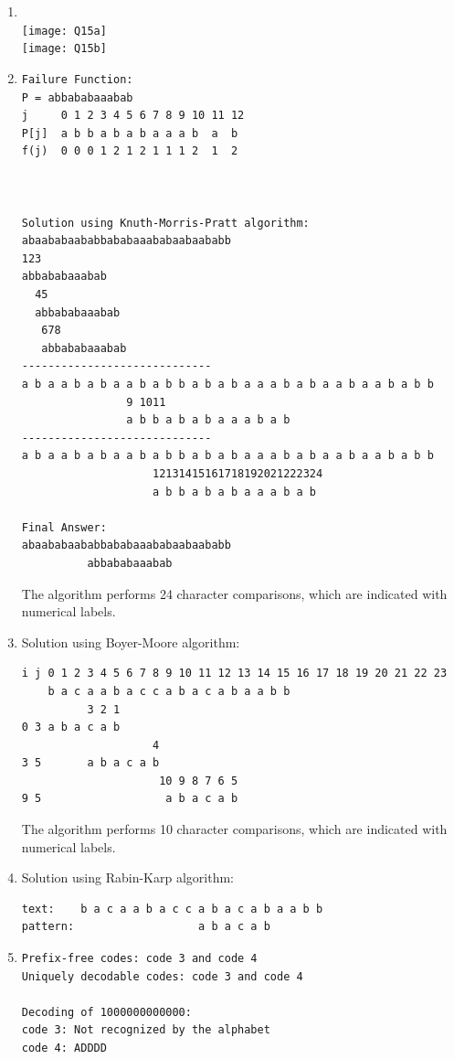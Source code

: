 \documentclass[11pt,fleqn]{article}
\begin{document}
\begin{enumerate}
\newpage

	\item $~$\\
\texttt{[image: Q15a]} \\
\texttt{[image: Q15b]} \\

	\item 
\begin{Verbatim}
Failure Function:
P = abbababaaabab
j     0 1 2 3 4 5 6 7 8 9 10 11 12
P[j]  a b b a b a b a a a b  a  b
f(j)  0 0 0 1 2 1 2 1 1 1 2  1  2



Solution using Knuth-Morris-Pratt algorithm:
abaababaababbababaaababaabaababb
123
abbababaaabab
  45
  abbababaaabab
   678
   abbababaaabab
-----------------------------
a b a a b a b a a b a b b a b a b a a a b a b a a b a a b a b b
                9 1011
                a b b a b a b a a a b a b
-----------------------------
a b a a b a b a a b a b b a b a b a a a b a b a a b a a b a b b
                    12131415161718192021222324
                    a b b a b a b a a a b a b

Final Answer:
abaababaababbababaaababaabaababb
          abbababaaabab
\end{Verbatim}
The algorithm performs 24 character comparisons, which are
indicated with numerical labels.

	\item Solution using Boyer-Moore algorithm:
\begin{Verbatim}
i j 0 1 2 3 4 5 6 7 8 9 10 11 12 13 14 15 16 17 18 19 20 21 22 23
    b a c a a b a c c a b a c a b a a b b
          3 2 1
0 3 a b a c a b
                    4
3 5       a b a c a b
                     10 9 8 7 6 5
9 5                   a b a c a b
\end{Verbatim}
The algorithm performs 10 character comparisons, which are
indicated with numerical labels.
	\item Solution using Rabin-Karp algorithm:
\begin{Verbatim}
text:    b a c a a b a c c a b a c a b a a b b
pattern:                   a b a c a b
\end{Verbatim}

	\item 
\begin{Verbatim}
Prefix-free codes: code 3 and code 4
Uniquely decodable codes: code 3 and code 4

Decoding of 1000000000000:
code 3: Not recognized by the alphabet
code 4: ADDDD
\end{Verbatim}


\end{enumerate}
\end{document}
